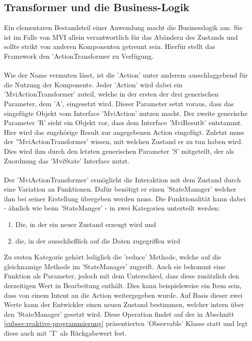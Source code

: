 \subsection{Transformer und die Business-Logik}
Ein elementaren Bestandsteil einer Anwendung macht die Businesslogik aus. Sie ist im Falle von MVI allein verantwortlich für das Abändern des Zustands und sollte strikt von anderen Komponenten getrennt sein. Hierfür stellt das Framework den 'ActionTransformer zu Verfügung.
\\\\
Wie der Name vermuten lässt, ist die 'Action' unter anderem ausschlaggebend für die Nutzung der Komponente. Jeder 'Action' wird dabei ein 'MviActionTransformer' zuteil, welche in der ersten der drei generischen Parameter, dem 'A', eingesetzt wird. Dieser Parameter setzt voraus, dass das eingefügte Objekt vom Interface 'MviAction' nutzen macht. Der zweite generische Parameter 'R' sieht ein Objekt vor, dass dem Interface 'MviResutlt' entstammt. Hier wird das zugehörige Result zur angegebenen Action eingefügt. Zuletzt muss der ''MviActionTransformer' wissen, mit welchen Zustand er zu tun haben wird. Dies wird ihm durch den letzten generischen Parameter 'S' mitgeteilt, der als Zuordnung das 'MviState' Interface nutzt. 
\\\\
Der 'MviActionTransformer' ermöglicht die Interaktion mit dem Zustand durch eine Variation an Funktionen. Dafür benötigt er einen 'StateManager' welcher ihm bei seiner Erstellung übergeben werden muss. Die Funktionalität kann dabei - ähnlich wie beim 'StateManger' - in zwei Kategorien unterteilt werden:
\begin{enumerate}
	\item Die, in der ein neuer Zustand erzeugt wird und
	\item die, in der ausschließlich auf die Daten zugegriffen wird
\end{enumerate} 
Zu ersten Kategorie gehört lediglich die 'reduce' Methode, welche auf die gleichnamige Methode im 'StateManager' zugreift. Auch sie bekommt eine Funktion als Parameter, jedoch mit dem Unterschied, dass diese zusätzlich den derzeitigen Wert in Bearbeitung enthält. Dies kann beispielsweise ein Item sein, dass von einem Intent an die Action weitergegeben wurde. Auf Basis dieser zwei Werte kann der Entwickler einen neuen Zustand bestimmen, welcher intern über den 'StateManager' gesetzt wird. Diese Operation findet auf der in Abschnitt
\ref{subsec:reaktive-programmierung}
präsentierten 'Observable' Klasse statt und legt diese auch mit 'T' als Rückgabewert fest.
